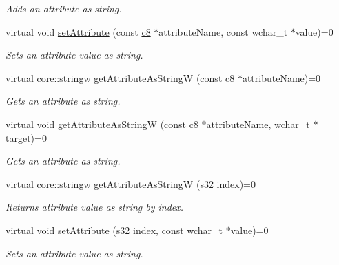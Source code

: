 \begin{DoxyCompactItemize}
\begin{DoxyCompactList}\small\item\em Adds an attribute as string. \end{DoxyCompactList}\item 
virtual void \hyperlink{classirr_1_1io_1_1IAttributes_a61d592097529c763c1da1db8ef5af224}{set\+Attribute} (const \hyperlink{namespaceirr_a9395eaea339bcb546b319e9c96bf7410}{c8} $\ast$attribute\+Name, const wchar\+\_\+t $\ast$value)=0
\begin{DoxyCompactList}\small\item\em Sets an attribute value as string. \end{DoxyCompactList}\item 
virtual \hyperlink{namespaceirr_1_1core_aef83fafbb1b36fcce44c07c9be23a7f2}{core\+::stringw} \hyperlink{classirr_1_1io_1_1IAttributes_a874219751c3a52d781cdfa372cd8bcf5}{get\+Attribute\+As\+StringW} (const \hyperlink{namespaceirr_a9395eaea339bcb546b319e9c96bf7410}{c8} $\ast$attribute\+Name)=0
\begin{DoxyCompactList}\small\item\em Gets an attribute as string. \end{DoxyCompactList}\item 
virtual void \hyperlink{classirr_1_1io_1_1IAttributes_a972aca66779e767e635a1c52b1559382}{get\+Attribute\+As\+StringW} (const \hyperlink{namespaceirr_a9395eaea339bcb546b319e9c96bf7410}{c8} $\ast$attribute\+Name, wchar\+\_\+t $\ast$target)=0
\begin{DoxyCompactList}\small\item\em Gets an attribute as string. \end{DoxyCompactList}\item 
virtual \hyperlink{namespaceirr_1_1core_aef83fafbb1b36fcce44c07c9be23a7f2}{core\+::stringw} \hyperlink{classirr_1_1io_1_1IAttributes_a60ab65d3d3e123af2b2d47b1bd48f771}{get\+Attribute\+As\+StringW} (\hyperlink{namespaceirr_ac66849b7a6ed16e30ebede579f9b47c6}{s32} index)=0
\begin{DoxyCompactList}\small\item\em Returns attribute value as string by index. \end{DoxyCompactList}\item 
virtual void \hyperlink{classirr_1_1io_1_1IAttributes_a679ae0badc391b6814db9cd7cf3d45bc}{set\+Attribute} (\hyperlink{namespaceirr_ac66849b7a6ed16e30ebede579f9b47c6}{s32} index, const wchar\+\_\+t $\ast$value)=0
\begin{DoxyCompactList}\small\item\em Sets an attribute value as string. \end{DoxyCompactList}\item 

\end{DoxyCompactItemize}
